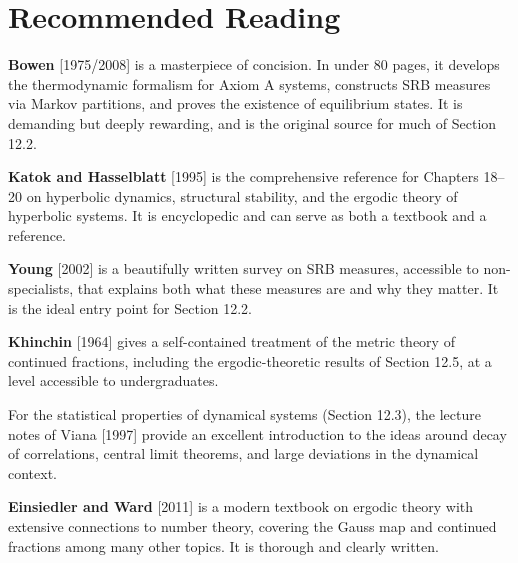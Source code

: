 \section*{Recommended Reading}

\textbf{Bowen} [1975/2008] is a masterpiece of concision. In under 80 pages, it develops the thermodynamic formalism for Axiom A systems, constructs SRB measures via Markov partitions, and proves the existence of equilibrium states. It is demanding but deeply rewarding, and is the original source for much of Section 12.2.

\textbf{Katok and Hasselblatt} [1995] is the comprehensive reference for Chapters 18--20 on hyperbolic dynamics, structural stability, and the ergodic theory of hyperbolic systems. It is encyclopedic and can serve as both a textbook and a reference.

\textbf{Young} [2002] is a beautifully written survey on SRB measures, accessible to non-specialists, that explains both what these measures are and why they matter. It is the ideal entry point for Section 12.2.

\textbf{Khinchin} [1964] gives a self-contained treatment of the metric theory of continued fractions, including the ergodic-theoretic results of Section 12.5, at a level accessible to undergraduates.

For the statistical properties of dynamical systems (Section 12.3), the lecture notes of Viana [1997] provide an excellent introduction to the ideas around decay of correlations, central limit theorems, and large deviations in the dynamical context.

\textbf{Einsiedler and Ward} [2011] is a modern textbook on ergodic theory with extensive connections to number theory, covering the Gauss map and continued fractions among many other topics. It is thorough and clearly written.
